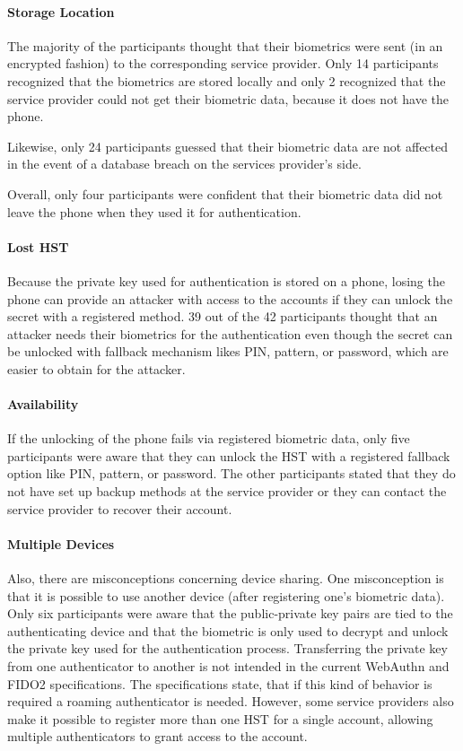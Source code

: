 \documentclass[runningheads]{llncs}
\begin{document}
\paragraph{Storage Location}
The majority of the participants thought that their biometrics were sent (in an encrypted fashion) to the corresponding service provider. Only 14 participants recognized that the biometrics are stored locally and only 2 recognized that the service provider could not get their biometric data, because it does not have the phone.

Likewise, only 24 participants guessed that their biometric data are not affected in the event of a database breach on the services provider's side.

Overall, only four participants were confident that their biometric data did not leave the phone when they used it for authentication.

\paragraph{Lost HST}
Because the private key used for authentication is stored on a phone, losing the phone can provide an attacker with access to the accounts if they can unlock the secret with a registered method. 39 out of the 42 participants thought that an attacker needs their biometrics for the authentication even though the secret can be unlocked with fallback mechanism likes PIN, pattern, or password, which are easier to obtain for the attacker.

\paragraph{Availability}
If the unlocking of the phone fails via registered biometric data, only five participants were aware that they can unlock the HST with a registered fallback option like PIN, pattern, or password. The other participants stated that they do not have set up backup methods at the service provider or they can contact the service provider to recover their account.

\paragraph{Multiple Devices}
Also, there are misconceptions concerning device sharing. One misconception is that it is possible to use another device (after registering one's biometric data). Only six participants were aware that the public-private key pairs are tied to the authenticating device and that the biometric is only used to decrypt and unlock the private key used for the authentication process. Transferring the private key from one authenticator to another is not intended in the current WebAuthn and FIDO2 specifications. The specifications state, that if this kind of behavior is required a roaming authenticator is needed. However, some service providers also make it possible to register more than one HST for a single account, allowing multiple authenticators to grant access to the account.
\end{document}
